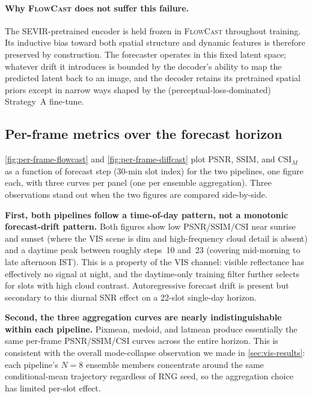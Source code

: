 \documentclass[11pt,a4paper]{article}
\begin{document}
\paragraph{Why \textsc{FlowCast} does not suffer this failure.} The
{SEVIR}-pretrained encoder is held frozen in \textsc{FlowCast} throughout
training. Its inductive bias toward both spatial structure and dynamic
features is therefore preserved by construction. The forecaster operates in
this fixed latent space; whatever drift it introduces is bounded by the
decoder's ability to map the predicted latent back to an image, and the
decoder retains its pretrained spatial priors except in narrow ways
shaped by the (perceptual-loss-dominated) Strategy~A fine-tune.

\subsection{Per-frame metrics over the forecast horizon}
\label{sec:per-frame}

\cref{fig:per-frame-flowcast} and \cref{fig:per-frame-diffcast} plot
PSNR, SSIM, and CSI$_M$ as a function of forecast step (30-min slot
index) for the two pipelines, one figure each, with three curves per
panel (one per ensemble aggregation). Three observations stand out when
the two figures are compared side-by-side.

\textbf{First, both pipelines follow a time-of-day pattern, not a
monotonic forecast-drift pattern.} Both figures show low PSNR/SSIM/CSI
near sunrise and sunset (where the VIS scene is dim and high-frequency
cloud detail is absent) and a daytime peak between roughly steps~10
and~23 (covering mid-morning to late afternoon IST). This is a property
of the VIS channel: visible reflectance has effectively no signal at
night, and the daytime-only training filter further selects for slots
with high cloud contrast. Autoregressive forecast drift is present but
secondary to this diurnal SNR effect on a 22-slot single-day horizon.

\textbf{Second, the three aggregation curves are nearly indistinguishable
within each pipeline.} Pixmean, medoid, and latmean produce essentially
the same per-frame PSNR/SSIM/CSI curves across the entire horizon. This
is consistent with the overall mode-collapse observation we made in
\cref{sec:vis-results}: each pipeline's $N=8$ ensemble members
concentrate around the same conditional-mean trajectory regardless of
RNG seed, so the aggregation choice has limited per-slot effect.
\end{document}
